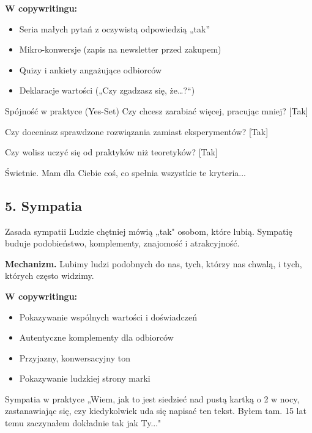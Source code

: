 \documentclass[
  12pt,
  a4paper,
  twoside,
  openright,
  12pt,
  DIV=12,
  BCOR=12mm]{scrbook}
\providecommand{\tightlist}{%
  \setlength{\itemsep}{0pt}\setlength{\parskip}{0pt}}\usepackage{longtable,booktabs,array}
\begin{document}
\textbf{W copywritingu:}

\begin{itemize}
\tightlist
\item
  Seria małych pytań z oczywistą odpowiedzią „tak''
\item
  Mikro-konwersje (zapis na newsletter przed zakupem)
\item
  Quizy i ankiety angażujące odbiorców
\item
  Deklaracje wartości („Czy zgadzasz się, że\ldots?{}``)
\end{itemize}

\begin{przyklad}{Spójność w praktyce (Yes-Set)}
Czy chcesz zarabiać więcej, pracując mniej? [Tak]

Czy doceniasz sprawdzone rozwiązania zamiast eksperymentów? [Tak]

Czy wolisz uczyć się od praktyków niż teoretyków? [Tak]

Świetnie. Mam dla Ciebie coś, co spełnia wszystkie te kryteria...
\end{przyklad}

\subsection{5. Sympatia}\label{sympatia}

\begin{pojecie}{Zasada sympatii}
Ludzie chętniej mówią „tak" osobom, które lubią. Sympatię buduje podobieństwo, komplementy, znajomość i atrakcyjność.
\end{pojecie}

\textbf{Mechanizm.} Lubimy ludzi podobnych do nas, tych, którzy nas
chwalą, i tych, których często widzimy.

\textbf{W copywritingu:}

\begin{itemize}
\tightlist
\item
  Pokazywanie wspólnych wartości i doświadczeń
\item
  Autentyczne komplementy dla odbiorców
\item
  Przyjazny, konwersacyjny ton
\item
  Pokazywanie ludzkiej strony marki
\end{itemize}

\begin{przyklad}{Sympatia w praktyce}
„Wiem, jak to jest siedzieć nad pustą kartką o 2 w nocy, zastanawiając się, czy kiedykolwiek uda się napisać ten tekst. Byłem tam. 15 lat temu zaczynałem dokładnie tak jak Ty..."
\end{przyklad}
\end{document}
